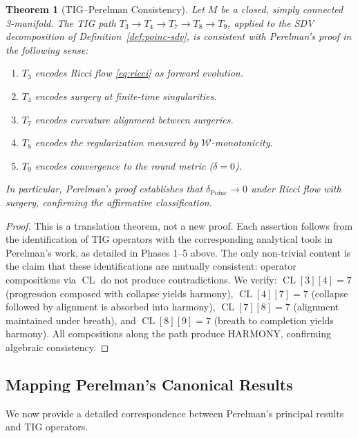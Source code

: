 \documentclass[11pt]{article}
\newtheorem{theorem}{Theorem}[section]
\DeclareMathOperator{\CL}{CL}
\begin{document}
\begin{theorem}[TIG--Perelman Consistency]
\label{thm:consistency}
Let $M$ be a closed, simply connected 3-manifold.  The TIG path
$T_3 \to T_4 \to T_7 \to T_8 \to T_9$, applied to the SDV
decomposition of Definition~\ref{def:poinc-sdv}, is consistent with
Perelman's proof in the following sense:
\begin{enumerate}
\item $T_3$ encodes Ricci flow \eqref{eq:ricci} as forward evolution.
\item $T_4$ encodes surgery at finite-time singularities.
\item $T_7$ encodes curvature alignment between surgeries.
\item $T_8$ encodes the regularization measured by
$\mathcal{W}$-monotonicity.
\item $T_9$ encodes convergence to the round metric ($\delta = 0$).
\end{enumerate}
In particular, Perelman's proof establishes that
$\delta_{\mathrm{Poinc}} \to 0$ under Ricci flow with surgery,
confirming the affirmative classification.
\end{theorem}

\begin{proof}
This is a translation theorem, not a new proof.  Each assertion
follows from the identification of TIG operators with the corresponding
analytical tools in Perelman's work, as detailed in
Phases 1--5 above.  The only non-trivial content is the claim that
these identifications are mutually consistent: operator compositions
via $\CL$ do not produce contradictions.  We verify:
$\CL[3][4] = 7$ (progression composed with collapse yields harmony),
$\CL[4][7] = 7$ (collapse followed by alignment is absorbed into
harmony), $\CL[7][8] = 7$ (alignment maintained under breath), and
$\CL[8][9] = 7$ (breath to completion yields harmony).  All
compositions along the path produce HARMONY, confirming algebraic
consistency.
\end{proof}

\subsection{Mapping Perelman's Canonical Results}
\label{subsec:poinc-mapping}

We now provide a detailed correspondence between Perelman's principal
results and TIG operators.
\end{document}
